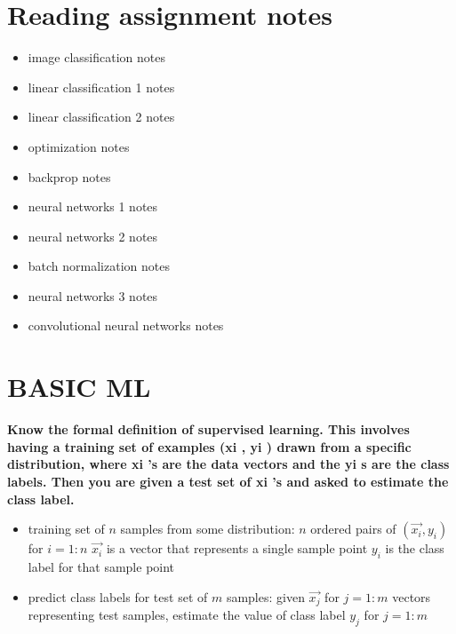 \documentclass[10pt,letterpaper]{article}
\begin{document}


\section{Reading assignment notes}
\begin{itemize}
\item image classification
\subitem notes
\item linear classification 1
\subitem notes
\item linear classification 2
\subitem notes
\item optimization
\subitem notes
\item backprop
\subitem notes
\item neural networks 1
\subitem notes
\item neural networks 2
\subitem notes
\item batch normalization 
\subitem notes
\item neural networks 3
\subitem notes
\item convolutional neural networks
\subitem notes
\end{itemize}



\section{BASIC ML}
\subitem \textbf{ Know the formal definition of supervised learning. This involves having a training set of examples (xi , yi ) drawn from a specific distribution, where xi ’s are the data vectors and the yi s are the class labels. Then you are given a test set of xi ’s and asked to estimate the class label.}
\begin{solution}
\begin{itemize}
\item training set of $n$ samples from some distribution:
\subitem $n$ ordered pairs of $(\vec{x_i}, y_i)$ for $i = 1:n$  
\subitem $\vec{x_i}$ is a vector that represents a single sample point 
\subitem $y_i$ is the class label for that sample point 
\item predict class labels for test set of $m$ samples:
\subitem given $\vec{x_j}$ for $j = 1:m$ vectors representing test samples,
\subitem estimate the value of class label $y_j$ for $j = 1:m$ 
\end{itemize}
\end{solution}
\end{document}
